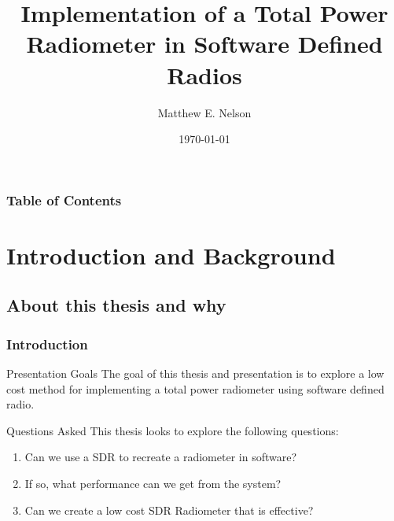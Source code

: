 \documentclass{beamer}
\title[SDR Radiometer]{Implementation of a Total Power Radiometer in Software Defined Radios}
\author{Matthew E. Nelson}
\institute[ISU] 
{
Iowa State University \\ 
\medskip
\textit{mnelson@iastate.edu} %
}
\date{\today}
\begin{document}
\begin{frame}
\titlepage 
\end{frame}

\begin{frame}[allowframebreaks]
\frametitle{Table of Contents} 
\begin{multicols}{2}
\tableofcontents[hideallsubsections]
\end{multicols}
\end{frame}


\section{Introduction and Background} 
\subsection{About this thesis and why}
\begin{frame}
\frametitle{Introduction}
\begin{block}{Presentation Goals}
The goal of this thesis and presentation is to explore a low cost method for implementing a total power radiometer using software defined radio.
\end{block}
\pause

\begin{block}{Questions Asked}
This thesis looks to explore the following questions: 
\begin{enumerate}
\item Can we use a SDR to recreate a radiometer in software?
\item If so, what performance can we get from the system?
\item Can we create a low cost SDR Radiometer that is effective?
\end{enumerate}
\end{block}
\end{frame} 
\end{document}
